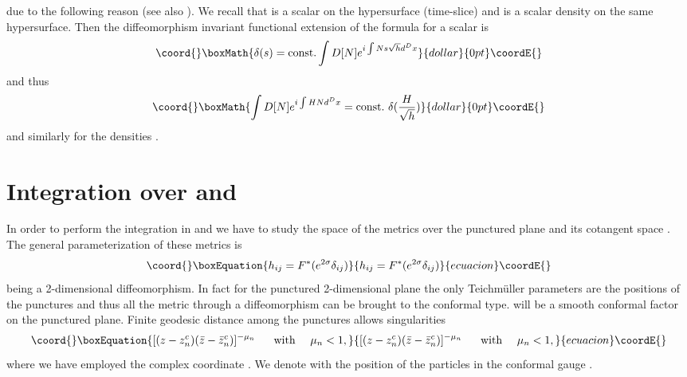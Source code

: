 \documentclass[a4paper,12pt]{article}
\begin{document}
due to the following reason (see also \cite{carlip}). We recall that \coordHE{} is a
scalar on the hypersurface \coordHE{} (time-slice) and \coordHE{} is a scalar
density on the same hypersurface.  Then the diffeomorphism invariant functional
extension of the formula \coordHE{} for
a scalar \coordHE{} is
$$\coord{}\boxMath{
\delta(s)={\rm const.} \int D[N] e^{i\int Ns\sqrt{h}d^Dx}
}{dollar}{0pt}\coordE{}$$
and thus
$$\coord{}\boxMath{
 \int D[N] e^{i\int HNd^Dx}={\rm const.}~\delta(\frac{H}{\sqrt{h}})
}{dollar}{0pt}\coordE{}$$
and similarly for the densities \coordHE{}.



\noindent

\section{Integration over \coordHE{} and
\coordHE{}}\label{IntegrationDhDpi}  


In order to perform the integration in \coordHE{} and \coordHE{}
we have to study the space of the metrics over the punctured plane
 and its cotangent space \cite{bers,dhoker}.  The general
parameterization of these metrics is
\begin{equation}\coord{}\boxEquation{
h_{ij} = F^*( e^{2\sigma} \delta_{ij})
}{
h_{ij} = F^*( e^{2\sigma} \delta_{ij})
}{ecuacion}\coordE{}\end{equation}
being \coordHE{} a 2-dimensional diffeomorphism.
In 
fact for the punctured 2-dimensional plane the only Teichm\"uller
parameters are the positions of the punctures \cite{bers} and thus all
the metric through a diffeomorphism can be brought to the conformal
type.  \coordHE{} will be a smooth conformal factor on the
punctured plane. Finite geodesic distance among the punctures allows
singularities 
\begin{equation}\coord{}\boxEquation{\label{singularities}
[(z-z^c_n)(\bar z-\bar z^c_n)]^{-\mu_n}~~~~{\rm~with}~~~~\mu_n<1,
}{[(z-z^c_n)(\bar z-\bar z^c_n)]^{-\mu_n}~~~~{\rm~with}~~~~\mu_n<1,
}{ecuacion}\coordE{}\end{equation}
where we have employed the complex coordinate \coordHE{}. We denote with
\coordHE{} the position of the particles in the conformal gauge
\coordHE{}.
\end{document}
